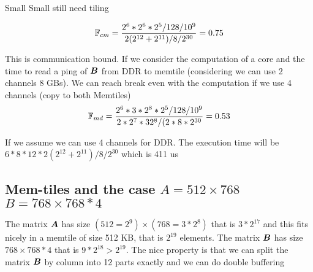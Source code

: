 \documentclass[journal]{IEEEtran}
\begin{document}
\begin{algorithm}
  \caption{Small Small still need tiling}
  \label{alg:one3}
  \begin{algorithmic}[1]
      \ENDFOR
    \ENDFOR
  \end{algorithmic}  
\end{algorithm}

\[
\mathbb{F}_{cm} = \frac{2^6 * 2^6 * 2^5/128/10^9 } {2(2^{12}+2^{11})/8/2^{30}}=  0.75  
\]

This is communication bound. If we consider the computation of a core
and the time to read a ping of ${\boldsymbol B}$ from DDR to memtile
(considering we can use 2 channels 8 GBs). We can reach break even
with the computation if we use 4 channels (copy to both
Memtiles)
\[
\mathbb{F}_{md} = \frac{2^6 * 3*2^8 * 2^5 /128/10^9  } {2*2^7*32^8/(2*8*2^{30}} = 0.53
\]

If we assume we can use 4 channels for DDR. The execution time will be
$6*8*12*{2(2^{12}+2^{11})/8/2^{30}}$ which is 411 us




\subsection{Mem-tiles and the case   $A=512\times 768$ $B=768\times 768*4$ }
The matrix ${\boldsymbol A}$ has size $(512=2^9) \times (768= 3*2^8)$ that is
$3*2^{17}$ and this fits nicely in a memtile of size 512 KB, that is
$2^{19}$ elements.  The matrix ${\boldsymbol B}$ has size $768 \times 768*4$
that is $9*2^{18}>2^{19}$. The nice property is that we can split the
matrix ${\boldsymbol B}$ by column into 12 parts exactly and we can do double
buffering 
\end{document}
